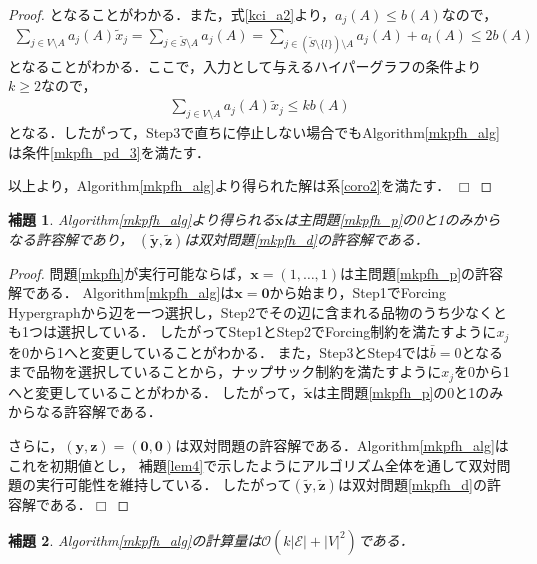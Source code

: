 \documentclass[11pt,dvipdfmx]{jarticle}
\def\qed{\hfill $\Box$}
\numberwithin{equation}{section}
\newtheorem{lem}{補題}[section]
\newtheorem{proof}{証明}
\begin{document}
\begin{proof}
            となることがわかる．また，式\eqref{kci_a2}より，$a_j(A)\le b(A)$なので，
            \begin{align}
                \sum_{j\in V\setminus A}{a_j(A)\tilde{x}_j}=\sum_{j\in\tilde{S}\setminus A}{a_j(A)}=\sum_{j\in(\tilde{S}\setminus\{l\})\setminus A}{a_j(A)}+a_l(A)\le2b(A)
            \end{align}
            となることがわかる．ここで，入力として与えるハイパーグラフの条件より$k\ge2$なので，
            \begin{align}
                \sum_{j\in V\setminus A}{a_j(A)\tilde{x}_j}\le kb(A)
            \end{align}
            となる．したがって，Step3で直ちに停止しない場合でもAlgorithm\ref{mkpfh_alg}は条件\eqref{mkpfh_pd_3}を満たす．\par
            以上より，Algorithm\ref{mkpfh_alg}より得られた解は系\rm\ref{coro2}を満たす．
            \qed
        \end{proof}
        \begin{lem}
            \rm Algorithm\ref{mkpfh_alg}より得られる$\tilde{\bm{x}}$は主問題\eqref{mkpfh_p}の0と1のみからなる許容解であり，
            $(\tilde{\bm{y}},\tilde{\bm{z}})$は双対問題\eqref{mkpfh_d}の許容解である．
        \end{lem}
        \begin{proof}
            問題\eqref{mkpfh}が実行可能ならば，$\bm{x}=(1,\dotsc,1)$は主問題\eqref{mkpfh_p}の許容解である．
            \rm Algorithm\ref{mkpfh_alg}は$\bm{x}=\bm{0}$から始まり，Step1でForcing Hypergraphから辺を一つ選択し，Step2でその辺に含まれる品物のうち少なくとも1つは選択している．
            したがってStep1とStep2でForcing制約を満たすように$x_j$を0から1へと変更していることがわかる．
            また，Step3とStep4では$\bar{b}=0$となるまで品物を選択していることから，ナップサック制約を満たすように$x_j$を0から1へと変更していることがわかる．
            したがって，$\tilde{\bm{x}}$は主問題\eqref{mkpfh_p}の0と1のみからなる許容解である．\par
            さらに，$(\bm{y},\bm{z})=(\bm{0},\bm{0})$は双対問題の許容解である．Algorithm\ref{mkpfh_alg}はこれを初期値とし，
            補題\ref{lem4}で示したようにアルゴリズム全体を通して双対問題の実行可能性を維持している．
            したがって$(\tilde{\bm{y}},\tilde{\bm{z}})$は双対問題\eqref{mkpfh_d}の許容解である．\qed
        \end{proof}
        \begin{lem}
            \rm Algorithm\ref{mkpfh_alg}の計算量は$\mathcal{O}(k|\mathcal{E}|+|V|^2)$である．
            \label{order2}
        \end{lem}
\end{document}
